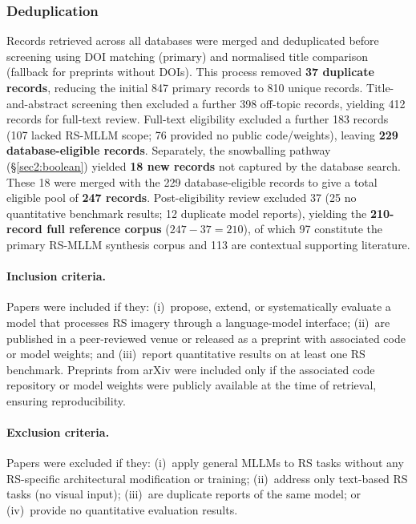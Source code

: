 \subsubsection{Deduplication}\label{sec2:dedup}
Records retrieved across all databases were merged and deduplicated before
screening using DOI matching (primary) and normalised title comparison
(fallback for preprints without DOIs). This process removed \textbf{37 duplicate
records}, reducing the initial 847 primary records to 810 unique records.
Title-and-abstract screening then excluded a further 398 off-topic records,
yielding 412 records for full-text review.
Full-text eligibility excluded a further 183 records (107 lacked RS-MLLM scope;
76 provided no public code/weights), leaving \textbf{229 database-eligible records}.
Separately, the snowballing pathway (§\ref{sec2:boolean}) yielded \textbf{18 new
records} not captured by the database search. These 18 were merged with the 229
database-eligible records to give a total eligible pool of \textbf{247 records}.
Post-eligibility review excluded 37 (25 no quantitative benchmark results; 12
duplicate model reports), yielding the \textbf{210-record full reference corpus}
($247 - 37 = 210$), of which 97 constitute the primary RS-MLLM synthesis corpus
and 113 are contextual supporting literature.

\paragraph{Inclusion criteria.}
Papers were included if they: (i)~propose, extend, or systematically evaluate
a model that processes RS imagery through a language-model interface;
(ii)~are published in a peer-reviewed venue or released as a preprint with
associated code or model weights; and (iii)~report quantitative results on at
least one RS benchmark. Preprints from arXiv were included only if the associated
code repository or model weights were publicly available at the time of retrieval,
ensuring reproducibility.

\paragraph{Exclusion criteria.}
Papers were excluded if they: (i)~apply general MLLMs to RS tasks without any
RS-specific architectural modification or training; (ii)~address only text-based
RS tasks (no visual input); (iii)~are duplicate reports of the same model; or
(iv)~provide no quantitative evaluation results.

